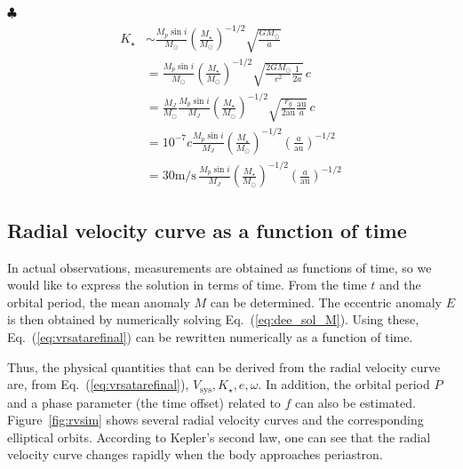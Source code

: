 \begin{itembox}{$\clubsuit$}
\footnotesize
\color{gray}
\begin{align}
    K_\star &\sim \frac{M_p \sin{i}}{M_\odot}\left(\frac{M_\star}{M_\odot} \right)^{-1/2}  \sqrt{ \frac{G M_\odot}{a} } \nonumber \\
    &= \frac{M_p \sin{i}}{M_\odot}\left(\frac{M_\star}{M_\odot} \right)^{-1/2} \sqrt{ \frac{2 G M_\odot}{c^2}\frac{1}{2a} } \, c \nonumber \\
    &= \frac{M_J}{M_\odot} \frac{M_p \sin{i}}{M_J} \left(\frac{M_\star}{M_\odot} \right)^{-1/2} \sqrt{ \frac{r_g}{2  \mathrm{au}} \frac{\mathrm{au}}{a} }\, c \nonumber \\
    &= 10^{-7} c \frac{M_p \sin{i}}{M_J}  \left(\frac{M_\star}{M_\odot} \right)^{-1/2} \left(\frac{a}{\mathrm{au}} \right)^{-1/2} \nonumber \\
    &= 30 \mathrm{m/s} \, \frac{M_p \sin{i}}{M_J}\left(\frac{M_\star}{M_\odot} \right)^{-1/2} \left(\frac{a}{\mathrm{au}} \right)^{-1/2} \nonumber
\end{align}
\end{itembox}


\subsection*{Radial velocity curve as a function of time}

In actual observations, measurements are obtained as functions of time, so we would like to express the solution in terms of time. From the time $t$ and the orbital period, the mean anomaly $M$ can be determined. The eccentric anomaly $E$ is then obtained by numerically solving Eq.~(\ref{eq:dee_sol_M}). Using these, Eq.~(\ref{eq:vrsatarefinal}) can be rewritten numerically as a function of time.

Thus, the physical quantities that can be derived from the radial velocity curve are, from Eq.~(\ref{eq:vrsatarefinal}), $V_\mathrm{sys}, K_\star, e, \omega$. In addition, the orbital period $P$ and a phase parameter (the time offset) related to $f$ can also be estimated. Figure~\ref{fig:rvsim} shows several radial velocity curves and the corresponding elliptical orbits. According to Kepler’s second law, one can see that the radial velocity curve changes rapidly when the body approaches periastron.

